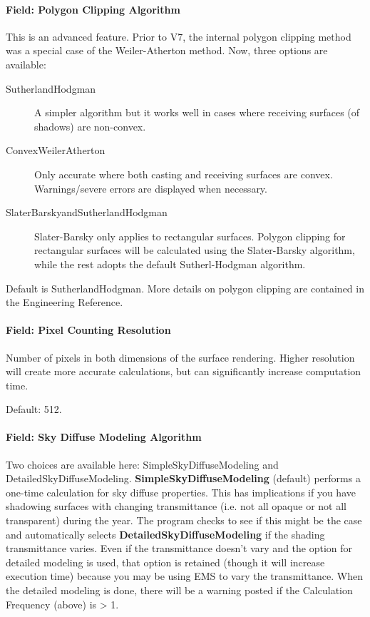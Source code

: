 \paragraph{Field: Polygon Clipping Algorithm}\label{field-polygon-clipping-algorithm}

This is an advanced feature. Prior to V7, the internal polygon clipping method was a special case of the Weiler-Atherton method. Now, three options are available:

\begin{description}
    \item[SutherlandHodgman] A simpler algorithm but it works well in cases where receiving surfaces (of shadows) are non-convex.
    \item[ConvexWeilerAtherton] Only accurate where both casting and receiving surfaces are convex. Warnings/severe errors are displayed when necessary.
    \item[SlaterBarskyandSutherlandHodgman] Slater-Barsky only applies to rectangular surfaces. Polygon clipping for rectangular surfaces will be calculated using the Slater-Barsky algorithm, while the rest adopts the default Sutherl-Hodgman algorithm.
\end{description}

Default is SutherlandHodgman. More details on polygon clipping are contained in the Engineering Reference.

\paragraph{Field: Pixel Counting Resolution}

Number of pixels in both dimensions of the surface rendering. Higher resolution will create more accurate calculations, but can significantly increase computation time.

Default: 512.

\paragraph{Field: Sky Diffuse Modeling Algorithm}\label{field-sky-diffuse-modeling-algorithm}

Two choices are available here: SimpleSkyDiffuseModeling and DetailedSkyDiffuseModeling. \textbf{SimpleSkyDiffuseModeling} (default) performs a one-time calculation for sky diffuse properties. This has implications if you have shadowing surfaces with changing transmittance (i.e. not all opaque or not all transparent) during the year. The program checks to see if this might be the case and automatically selects \textbf{DetailedSkyDiffuseModeling} if the shading transmittance varies. Even if the transmittance doesn't vary and the option for detailed modeling is used, that option is retained (though it will increase execution time) because you may be using EMS to vary the transmittance. When the detailed modeling is done, there will be a warning posted if the Calculation Frequency (above) is \textgreater{} 1.

